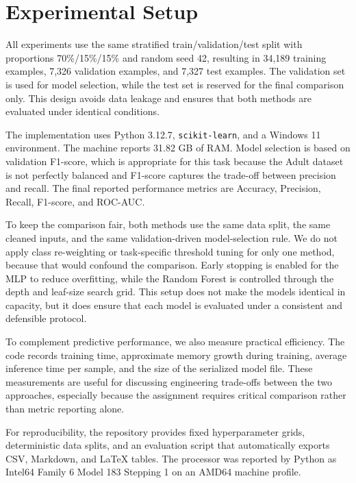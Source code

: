 \section{Experimental Setup}
\label{sec:experimental_setup}

All experiments use the same stratified train/validation/test split with proportions 70\%/15\%/15\% and random seed 42, resulting in 34,189 training examples, 7,326 validation examples, and 7,327 test examples. The validation set is used for model selection, while the test set is reserved for the final comparison only. This design avoids data leakage and ensures that both methods are evaluated under identical conditions.

The implementation uses Python 3.12.7, \texttt{scikit-learn}, and a Windows 11 environment. The machine reports 31.82 GB of RAM. Model selection is based on validation F1-score, which is appropriate for this task because the Adult dataset is not perfectly balanced and F1-score captures the trade-off between precision and recall. The final reported performance metrics are Accuracy, Precision, Recall, F1-score, and ROC-AUC.

To keep the comparison fair, both methods use the same data split, the same cleaned inputs, and the same validation-driven model-selection rule. We do not apply class re-weighting or task-specific threshold tuning for only one method, because that would confound the comparison. Early stopping is enabled for the MLP to reduce overfitting, while the Random Forest is controlled through the depth and leaf-size search grid. This setup does not make the models identical in capacity, but it does ensure that each model is evaluated under a consistent and defensible protocol.

To complement predictive performance, we also measure practical efficiency. The code records training time, approximate memory growth during training, average inference time per sample, and the size of the serialized model file. These measurements are useful for discussing engineering trade-offs between the two approaches, especially because the assignment requires critical comparison rather than metric reporting alone.

For reproducibility, the repository provides fixed hyperparameter grids, deterministic data splits, and an evaluation script that automatically exports CSV, Markdown, and \LaTeX{} tables. The processor was reported by Python as Intel64 Family 6 Model 183 Stepping 1 on an AMD64 machine profile.
